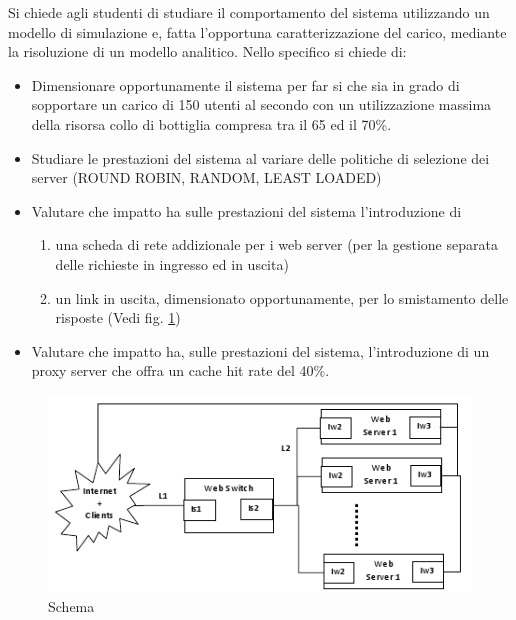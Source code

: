 Si chiede agli studenti di studiare il comportamento del sistema utilizzando un modello di simulazione e, fatta l’opportuna caratterizzazione del carico, mediante la risoluzione di un modello analitico. Nello specifico si chiede di: 
\begin{itemize}
	\item Dimensionare opportunamente il sistema per far si che sia in grado di sopportare un carico di 150 utenti al secondo con un utilizzazione massima della risorsa collo di bottiglia compresa tra il 65 ed il 70\%.
	\item Studiare le prestazioni del sistema al variare delle politiche di selezione dei server (ROUND ROBIN, RANDOM, LEAST LOADED) 
	\item Valutare che impatto ha sulle prestazioni del sistema l’introduzione di 
	\begin{enumerate}
		\item una scheda di rete addizionale per i web server (per la gestione separata delle richieste in ingresso ed in uscita)
		\item un link in uscita, dimensionato opportunamente, per lo smistamento delle risposte (Vedi fig. \ref{schema2}) 
	\end{enumerate}
	\item Valutare che impatto ha, sulle prestazioni del sistema, l’introduzione di un proxy server che offra un cache hit rate del 40\%.
\end{itemize}
\begin{figure}[H]
\begin{center}
\includegraphics[scale=1.2]{etc/schema2.png}
\caption{Schema}
\label{schema2}
\end{center}
\end{figure}
